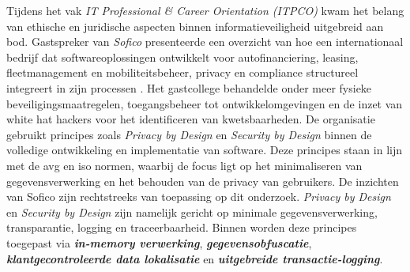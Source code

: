 Tijdens het vak \textit{IT Professional \& Career Orientation (ITPCO)} kwam het belang van ethische en juridische aspecten binnen informatieveiligheid uitgebreid aan bod. 
Gastspreker \textcite{SoficoGuestLecture2024} van \textit{Sofico} presenteerde een overzicht van hoe een internationaal bedrijf dat softwareoplossingen ontwikkelt voor autofinanciering, 
leasing, fleetmanagement en mobiliteitsbeheer, privacy en compliance structureel integreert in zijn processen \autocite{SoficoGuestLecture2024}. 
Het gastcollege behandelde onder meer fysieke beveiligingsmaatregelen, toegangsbeheer tot ontwikkelomgevingen en de inzet van white hat hackers voor het identificeren van kwetsbaarheden.
De organisatie gebruikt principes zoals \textit{Privacy by Design} en \textit{Security by Design} binnen de volledige ontwikkeling en implementatie van software. 
Deze principes staan in lijn met de \gls{avg} en \gls{iso} normen, waarbij de focus ligt op het minimaliseren van gegevensverwerking en het behouden van de privacy van gebruikers.
De inzichten van Sofico zijn rechtstreeks van toepassing op dit onderzoek.
\textit{Privacy by Design} en \textit{Security by Design} zijn namelijk gericht op minimale gegevensverwerking, transparantie, logging en traceerbaarheid. 
Binnen \textcite{Netskope2024PrivByDesign} worden deze principes toegepast via \textit{\textbf{in-memory verwerking}}, \textit{\textbf{gegevensobfuscatie}}, \textit{\textbf{klantgecontroleerde data lokalisatie}} en \textit{\textbf{uitgebreide transactie-logging}}.




